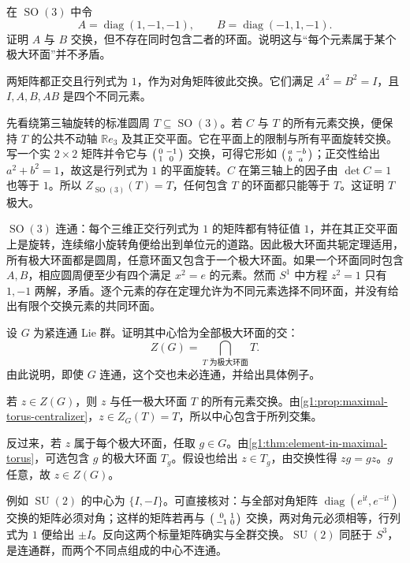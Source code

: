 \begin{exercise}\label{g1:ex:commuting-elements-no-common-torus}
	在 \(\operatorname{SO}(3)\) 中令
	\[
		A=\operatorname{diag}(1,-1,-1),\qquad
		B=\operatorname{diag}(-1,1,-1).
	\]
	证明 \(A\) 与 \(B\) 交换，但不存在同时包含二者的环面。说明这与“每个元素属于某个极大环面”并不矛盾。
\end{exercise}
\begin{solution}
	两矩阵都正交且行列式为 \(1\)，作为对角矩阵彼此交换。它们满足 \(A^2=B^2=I\)，且 \(I,A,B,AB\) 是四个不同元素。

	先看绕第三轴旋转的标准圆周 \(T\subseteq\operatorname{SO}(3)\)。若 \(C\) 与 \(T\) 的所有元素交换，便保持 \(T\) 的公共不动轴 \(\mathbb Re_3\) 及其正交平面。它在平面上的限制与所有平面旋转交换。写一个实 \(2\times2\) 矩阵并令它与 \(\begin{psmallmatrix}0&-1\\1&0\end{psmallmatrix}\) 交换，可得它形如 \(\begin{psmallmatrix}a&-b\\b&a\end{psmallmatrix}\)；正交性给出 \(a^2+b^2=1\)，故这是行列式为 \(1\) 的平面旋转。\(C\) 在第三轴上的因子由 \(\det C=1\) 也等于 \(1\)。所以 \(Z_{\operatorname{SO}(3)}(T)=T\)，任何包含 \(T\) 的环面都只能等于 \(T\)。这证明 \(T\) 极大。

	\(\operatorname{SO}(3)\) 连通：每个三维正交行列式为 \(1\) 的矩阵都有特征值 \(1\)，并在其正交平面上是旋转，连续缩小旋转角便给出到单位元的道路。因此极大环面共轭定理适用，所有极大环面都是圆周，任意环面又包含于一个极大环面。如果一个环面同时包含 \(A,B\)，相应圆周便至少有四个满足 \(x^2=e\) 的元素。然而 \(S^1\) 中方程 \(z^2=1\) 只有 \(1,-1\) 两解，矛盾。逐个元素的存在定理允许为不同元素选择不同环面，并没有给出有限个交换元素的共同环面。
\end{solution}

\begin{exercise}\label{g1:ex:center-intersection-maximal-tori}
	设 \(G\) 为紧连通 Lie 群。证明其中心恰为全部极大环面的交：
	\[
		Z(G)=\bigcap_{T\text{ 为极大环面}}T.
	\]
	由此说明，即使 \(G\) 连通，这个交也未必连通，并给出具体例子。
\end{exercise}
\begin{solution}
	若 \(z\in Z(G)\)，则 \(z\) 与任一极大环面 \(T\) 的所有元素交换。由\cref{g1:prop:maximal-torus-centralizer}，\(z\in Z_G(T)=T\)，所以中心包含于所列交集。

	反过来，若 \(z\) 属于每个极大环面，任取 \(g\in G\)。由\cref{g1:thm:element-in-maximal-torus}，可选包含 \(g\) 的极大环面 \(T_g\)。假设也给出 \(z\in T_g\)，由交换性得 \(zg=gz\)。\(g\) 任意，故 \(z\in Z(G)\)。

	例如 \(\operatorname{SU}(2)\) 的中心为 \(\{I,-I\}\)。可直接核对：与全部对角矩阵 \(\operatorname{diag}(e^{\mathrm{i}t},e^{-\mathrm{i}t})\) 交换的矩阵必须对角；这样的矩阵若再与 \(\begin{psmallmatrix}0&1\\-1&0\end{psmallmatrix}\) 交换，两对角元必须相等，行列式为 \(1\) 便给出 \(\pm I\)。反向这两个标量矩阵确实与全群交换。\(\operatorname{SU}(2)\) 同胚于 \(S^3\)，是连通群，而两个不同点组成的中心不连通。
\end{solution}

